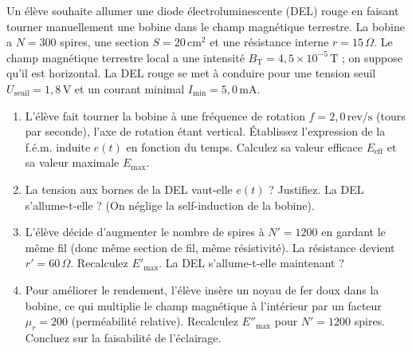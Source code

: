 \documentclass[11pt]{article}
\begin{document}
\begin{exercice}
Un élève souhaite allumer une diode électroluminescente (DEL) rouge en faisant tourner manuellement une bobine dans le champ magnétique terrestre. La bobine a $N = 300$ spires, une section $S = 20\,\text{cm}^2$ et une résistance interne $r = 15\,\Omega$. Le champ magnétique terrestre local a une intensité $B_{\text{T}} = 4,5 \times 10^{-5}\,\text{T}$ ; on suppose qu'il est horizontal. La DEL rouge se met à conduire pour une tension seuil $U_{\text{seuil}} = 1,8\,\text{V}$ et un courant minimal $I_{\text{min}} = 5,0\,\text{mA}$.
\begin{enumerate}
    \item L'élève fait tourner la bobine à une fréquence de rotation $f = 2,0\,\text{rev/s}$ (tours par seconde), l'axe de rotation étant vertical. Établissez l'expression de la f.é.m. induite $e(t)$ en fonction du temps. Calculez sa valeur efficace $E_{\text{eff}}$ et sa valeur maximale $E_{\text{max}}$.
    \item La tension aux bornes de la DEL vaut-elle $e(t)$ ? Justifiez. La DEL s'allume-t-elle ? (On néglige la self-induction de la bobine).
    \item L'élève décide d'augmenter le nombre de spires à $N' = 1200$ en gardant le même fil (donc même section de fil, même résistivité). La résistance devient $r' = 60\,\Omega$. Recalculez $E'_{\text{max}}$. La DEL s'allume-t-elle maintenant ?
    \item Pour améliorer le rendement, l'élève insère un noyau de fer doux dans la bobine, ce qui multiplie le champ magnétique à l'intérieur par un facteur $\mu_r = 200$ (perméabilité relative). Recalculez $E''_{\text{max}}$ pour $N' = 1200$ spires. Concluez sur la faisabilité de l'éclairage.
\end{enumerate}
\end{exercice}
\end{document}
